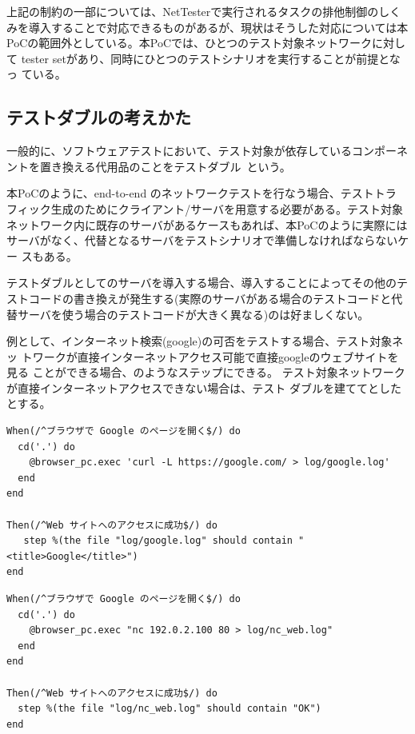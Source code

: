上記の制約の一部については、NetTesterで実行されるタスクの排他制御のしく
みを導入することで対応できるものがあるが、現状はそうした対応については本
PoCの範囲外としている。本PoCでは、ひとつのテスト対象ネットワークに対して
tester setがあり、同時にひとつのテストシナリオを実行することが前提となっ
ている。

  \subsection{テストダブルの考えかた}
一般的に、ソフトウェアテストにおいて、テスト対象が依存しているコンポーネ
ントを置き換える代用品のことをテストダブル~\cite{test-double}という。

本PoCのように、end-to-end のネットワークテストを行なう場合、テストトラ
フィック生成のためにクライアント/サーバを用意する必要がある。テスト対象
ネットワーク内に既存のサーバがあるケースもあれば、本PoCのように実際には
サーバがなく、代替となるサーバをテストシナリオで準備しなければならないケー
スもある。

テストダブルとしてのサーバを導入する場合、導入することによってその他のテ
ストコードの書き換えが発生する(実際のサーバがある場合のテストコードと代
替サーバを使う場合のテストコードが大きく異なる)のは好ましくない。

例として、インターネット検索(google)の可否をテストする場合、テスト対象ネッ
トワークが直接インターネットアクセス可能で直接googleのウェブサイトを見る
ことができる場合、のようなステップにできる。
テスト対象ネットワークが直接インターネットアクセスできない場合は、テスト
ダブルを建ててとしたとする。

\begin{lstlisting}[caption=実際のサービスを利用する場合,label=lst:real-service-test]
When(/^ブラウザで Google のページを開く$/) do
  cd('.') do
    @browser_pc.exec 'curl -L https://google.com/ > log/google.log'
  end
end

Then(/^Web サイトへのアクセスに成功$/) do
   step %(the file "log/google.log" should contain "<title>Google</title>")
end
\end{lstlisting}

\begin{lstlisting}[caption=テストダブルを利用する場合,label=lst:testdouble-test]
When(/^ブラウザで Google のページを開く$/) do
  cd('.') do
    @browser_pc.exec "nc 192.0.2.100 80 > log/nc_web.log"
  end
end

Then(/^Web サイトへのアクセスに成功$/) do
  step %(the file "log/nc_web.log" should contain "OK")
end
\end{lstlisting}


